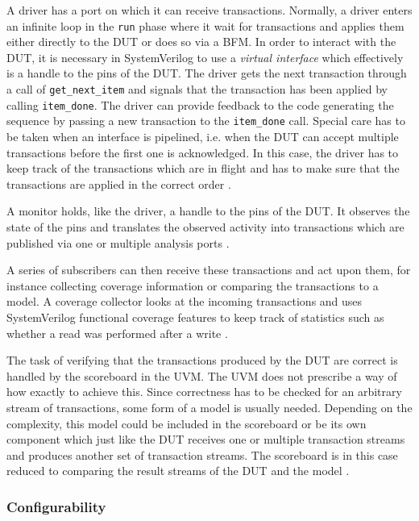 \documentclass[11pt,a4paper]{report}
\newcommand{\ttt}{\texttt}
\begin{document}
A driver has a port on which it can receive transactions. Normally, a driver enters an infinite loop in the \ttt{run}
phase where it wait for transactions and applies them either directly to the DUT or does so via a BFM. In order to
interact with the DUT, it is necessary in SystemVerilog to use a \textit{virtual interface} which effectively is a
handle to the pins of the DUT. The driver gets the next transaction through a call of \ttt{get\_next\_item} and
signals that the transaction has been applied by calling \ttt{item\_done}. The driver can provide feedback to the
code generating the sequence by passing a new transaction to the \ttt{item\_done} call. Special care has to be taken
when an interface is pipelined, i.e. when the DUT can accept multiple transactions before the first one is
acknowledged. In this case, the driver has to keep track of the transactions which are in flight and has to make sure
that the transactions are applied in the correct order \cite[ch. 4.7]{mehta2018asic}.

A monitor holds, like the driver, a handle to the pins of the DUT. It observes the state of the pins and translates
the observed activity into transactions which are published via one or multiple analysis ports \cite[Ch. 4.3]{mehta2018asic}.

A series of subscribers can then receive these transactions and act upon them, for instance collecting coverage
information or comparing the transactions to a model. A coverage collector looks at the incoming transactions and
uses SystemVerilog functional coverage features to keep track of statistics such as whether a read was performed
after a write \cite[Ch. 4.3]{mehta2018asic}.

The task of verifying that the transactions produced by the DUT are correct is handled by the scoreboard in the UVM.
The UVM does not prescribe a way of how exactly to achieve this. Since correctness has to be checked for an arbitrary
stream of transactions, some form of a model is usually needed. Depending on the complexity, this model could be
included in the scoreboard or be its own component which just like the DUT receives one or multiple transaction
streams and produces another set of transaction streams. The scoreboard is in this case reduced to comparing the
result streams of the DUT and the model \cite[Ch. 4.3]{mehta2018asic}.

\subsubsection{Configurability} %
\end{document}
